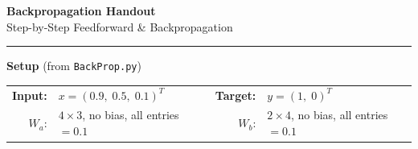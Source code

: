 \documentclass[11pt]{article}
\begin{document}
\begin{center}
{\Large \textbf{Backpropagation Handout}}\\[2pt]
{\normalsize Step-by-Step Feedforward \& Backpropagation}
\end{center}


\vspace{-2pt}
\begin{center}
\end{center}


\vspace{-2pt}\hrule\vspace{4pt}

\textbf{Setup}\; {\small (from \texttt{BackProp.py})}

\vspace{1pt}
\begin{tabular}{@{}rl@{\qquad\qquad}rl@{}}
\textbf{Input:} & $x = (0.9,\; 0.5,\; 0.1)^T$ &
\textbf{Target:} & $y = (1,\; 0)^T$ \\[2pt]
$W_a$: & $4\!\times\!3$, no bias, all entries $= 0.1$ &
$W_b$: & $2\!\times\!4$, no bias, all entries $= 0.1$ \\
\end{tabular}
\end{document}
